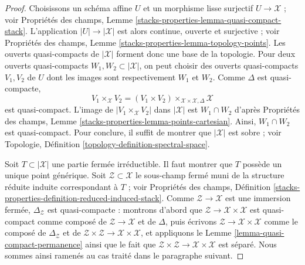 \begin{proof}
Choisissons un schéma affine $U$ et un morphisme lisse surjectif
$U \to \mathcal{X}$ ; voir Propriétés des champs, Lemme
\ref{stacks-properties-lemma-quasi-compact-stack}. L'application
$|U| \to |\mathcal{X}|$ est alors continue, ouverte et surjective ; voir
Propriétés des champs, Lemme
\ref{stacks-properties-lemma-topology-points}. Les ouverts quasi-compacts de
$|\mathcal{X}|$ forment donc une base de la topologie. Pour deux ouverts
quasi-compacts $W_1, W_2 \subset |\mathcal{X}|$, on peut choisir des ouverts
quasi-compacts $V_1, V_2$ de $U$ dont les images sont respectivement $W_1$ et
$W_2$. Comme $\Delta$ est quasi-compacte,
$$
V_1 \times_\mathcal{X} V_2 =
(V_1 \times V_2) \times_{\mathcal{X} \times \mathcal{X}, \Delta} \mathcal{X}
$$
est quasi-compact. L'image de $|V_1 \times_\mathcal{X} V_2|$ dans
$|\mathcal{X}|$ est $W_1 \cap W_2$ d'après Propriétés des champs, Lemme
\ref{stacks-properties-lemma-points-cartesian}. Ainsi,
$W_1 \cap W_2$ est quasi-compact. Pour conclure, il suffit de montrer que
$|\mathcal{X}|$ est sobre ; voir Topologie, Définition
\ref{topology-definition-spectral-space}.

\medskip\noindent
Soit $T \subset |\mathcal{X}|$ une partie fermée irréductible. Il faut
montrer que $T$ possède un unique point générique. Soit
$\mathcal{Z} \subset \mathcal{X}$ le sous-champ fermé muni de la structure
réduite induite correspondant à $T$ ; voir Propriétés des champs, Définition
\ref{stacks-properties-definition-reduced-induced-stack}.
Comme $\mathcal{Z} \to \mathcal{X}$ est une immersion fermée,
$\Delta_\mathcal{Z}$ est quasi-compacte : montrons d'abord que
$\mathcal{Z} \to \mathcal{X} \times \mathcal{X}$ est quasi-compact comme
composé de $\mathcal{Z} \to \mathcal{X}$ et de $\Delta$, puis écrivons
$\mathcal{Z} \to \mathcal{X} \times \mathcal{X}$ comme le composé de
$\Delta_\mathcal{Z}$ et de
$\mathcal{Z} \times \mathcal{Z} \to \mathcal{X} \times \mathcal{X}$, et
appliquons le Lemme \ref{lemma-quasi-compact-permanence} ainsi que le fait que
$\mathcal{Z} \times \mathcal{Z} \to \mathcal{X} \times \mathcal{X}$ est
séparé. Nous sommes ainsi ramenés au cas traité dans le paragraphe suivant.


\end{proof}
